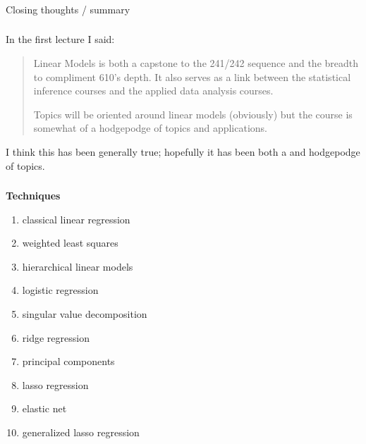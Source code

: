\begin{frame}[fragile] \frametitle{}

\begin{flushright}
{\color{yaleblue}\sc\fontsize{1cm}{0cm}\selectfont Closing thoughts / summary}
\end{flushright}

\end{frame}

\begin{frame}[fragile] \frametitle{}

In the first lecture I said:
\begin{quote}
Linear Models is both a capstone to the 241/242 sequence
and the breadth to compliment 610's depth. It also
serves as a link between the statistical inference courses
and the applied data analysis courses.

\medskip

Topics will be oriented around linear models (obviously) but
the course is somewhat of a hodgepodge of topics and applications.
\end{quote}
I think this has been generally true; hopefully it has been both
a  and  hodgepodge of topics.

\end{frame}

\begin{frame}[fragile] \frametitle{}

\textbf{Techniques}
\begin{enumerate}
\item classical linear regression
\item weighted least squares
\item hierarchical linear models
\item logistic regression
\item singular value decomposition
\item ridge regression
\item principal components
\item lasso regression
\item elastic net
\item generalized lasso regression
\end{enumerate}

\end{frame}

